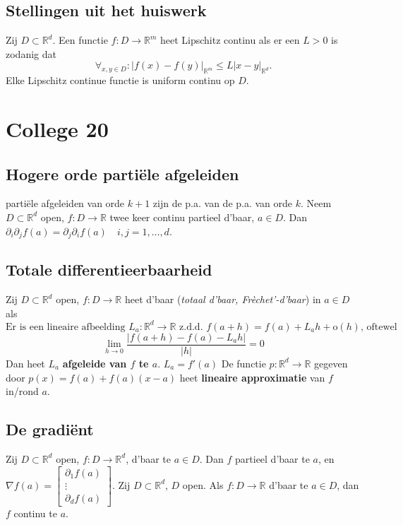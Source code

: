 \documentclass[a4paper]{exam}
\theoremstyle{definition}
\newcommand{\reals}{\mathbb{R}}
\begin{document}
	
	
	\subsection{Stellingen uit het huiswerk}
	\theorem Zij $D \subset \reals^d$. Een functie $f:D \rightarrow \reals^m$ heet Lipschitz continu als er een $L>0$ is zodanig dat
	\[\forall _{x,y \in D}: |f(x)-f(y)|_{\reals^m} \leq L|x-y|_{\reals^d}.\]
	Elke Lipschitz continue functie is uniform continu op $D$.
	\newpage
	\section{College 20}
	\subsection{Hogere orde parti\"ele afgeleiden}
	 parti\"ele afgeleiden van orde $k+1$ zijn de p.a. van de p.a. van orde $k$.
	 Neem $D \subset \reals^d$ open, $f:D \rightarrow \reals$ twee keer continu partieel d'baar, $a \in D$. Dan $\partial_i \partial_j f(a) = \partial_j \partial_i f(a) \quad i,j=1,\dots ,d$.
	\subsection{Totale differentieerbaarheid}
	 Zij $D \subset \reals^d$ open, $f:D \rightarrow \reals$ heet d'baar (\textit{totaal d'baar, Fr\`echet'-d'baar}) in $a \in D$ als
	\[\text{Er is een lineaire afbeelding } L_a:\reals^d \rightarrow \reals \text{ z.d.d. } f(a+h)=f(a)+L_a h +\mathrm{o}(h)\text{, oftewel}\]
	\[\lim_{h \rightarrow 0}\frac{|f(a+h)-f(a)-L_a h|}{|h|} = 0\]
	Dan heet $L_a$ \textbf{afgeleide van $f$ te $a$}.
	\nota $L_a = f'(a)$
	 De functie $ p: \reals^d \rightarrow \reals $ gegeven door $ p(x)=f(a)+f(a)(x-a) $ heet \textbf{lineaire approximatie} van $ f $ in/rond $ a $.
	\subsection{De gradi\"ent}
	 Zij $D \subset \reals^d$ open, $f: D \rightarrow \reals^d$, d'baar te $a \in D$. Dan $f$ partieel d'baar te $a$, en $\nabla f(a)= \begin{bmatrix}
	\partial_1 f(a) \\
	\vdots \\
	\partial_d f(a)
	\end{bmatrix}$.
	\theorem Zij $D \subset \reals^d$, $D$ open. Als $f: D \rightarrow \reals$ d'baar te $a \in D$, dan $f$ continu te $a$.
	
\end{document}
